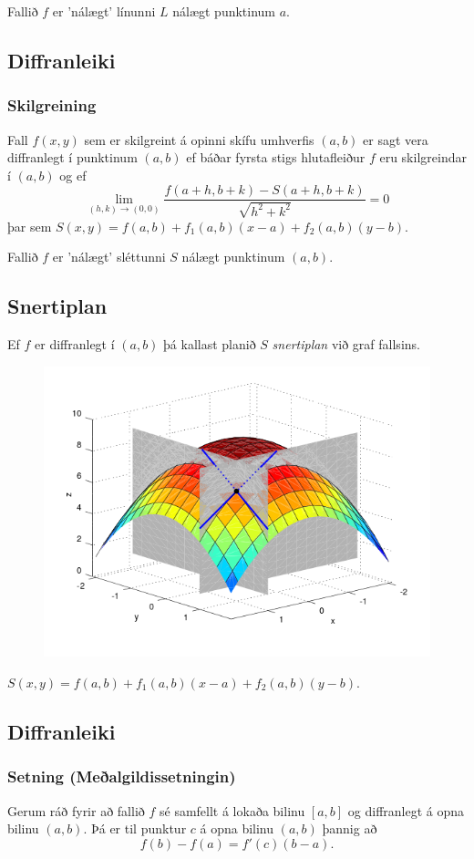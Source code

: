 \bigskip
Fallið $f$ er 'nálægt' línunni $L$ nálægt punktinum $a$.


\subsection{Diffranleiki} 

\subsubsection{Skilgreining }
Fall $f(x,y)$ sem er skilgreint á opinni
skífu umhverfis $(a,b)$ er sagt vera diffranlegt í punktinum $(a,b)$
ef báðar fyrsta stigs hlutafleiður $f$ eru skilgreindar í $(a,b)$ og ef 
$$\lim_{(h,k)\rightarrow (0,0)}
\frac{f(a+h, b+k)-S(a+h,b+k)}{\sqrt{h^2+k^2}}=0$$
þar sem $S(x,y) = f(a,b) + f_1(a,b)(x-a)+f_2(a,b)(y-b)$.

\bigskip
Fallið $f$ er 'nálægt' sléttunni $S$ nálægt punktinum $(a,b)$.


\subsection{Snertiplan}
  Ef $f$ er diffranlegt í $(a,b)$ þá kallast planið $S$ \emph{snertiplan} við graf fallsins.
  \begin{figure}
           \centering
            \includegraphics[width=0.6\linewidth]{bothpart.png}
	\caption*{}
    \end{figure}
    $S(x,y) = f(a,b) + f_1(a,b)(x-a)+f_2(a,b)(y-b)$.



\subsection{Diffranleiki} 

\subsubsection{Setning  (Meðalgildissetningin)}
Gerum ráð fyrir að fallið $f$
sé samfellt á lokaða bilinu $[a,b]$ og diffranlegt á opna bilinu
$(a,b)$.  Þá er til punktur $c$ á opna bilinu $(a,b)$ þannig að 
$$f(b)-f(a)=f'(c)(b-a).$$




